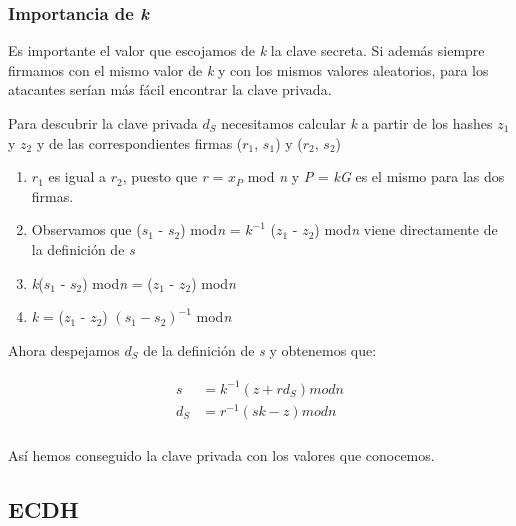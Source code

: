 \documentclass[11pt]{article}
\begin{document}
\subsubsection*{Importancia de \textit{k}}

Es importante el valor que escojamos de \textit{k} la clave secreta. Si además siempre firmamos con el mismo valor de \textit{k} y con los mismos valores aleatorios, para los atacantes serían más fácil encontrar la clave privada.

Para descubrir la clave privada \textit{$d_S$} necesitamos calcular \textit{k} a partir de los hashes \textit{$z_1$} y \textit{$z_2$} y de las correspondientes firmas (\textit{$r_1$}, \textit{$s_1$}) y (\textit{$r_2$}, \textit{$s_2$})


\begin{enumerate}
	\item $r_1$ es igual a $r_2$, puesto que \textit{r} = \textit{$x_P$} mod \textit{n} y \textit{P} = \textit{kG} es el mismo para las dos firmas.
	\item Observamos que  (\textit{$s_1$} - \textit{$s_2$}) mod\textit{n} = \textit{$k^{-1}$} (\textit{$z_1$} - \textit{$z_2$}) mod\textit{n} viene directamente de la definición de \textit{s}
	\item \textit{k}(\textit{$s_1$} - \textit{$s_2$}) mod\textit{n} = (\textit{$z_1$} - \textit{$z_2$}) mod\textit{n}
	\item \textit{k}  = (\textit{$z_1$} - \textit{$z_2$}) $(\textit{$s_1$} - \textit{$s_2$})^{-1}$ mod\textit{n}
\end{enumerate}

Ahora despejamos \textit{$d_S$} de la definición de \textit{s} y obtenemos que:


\begin{align}
\begin{split}
\textit{s} &= \textit{$k^{-1}$}(\textit{z} + \textit{r$d_S$}) mod \textit{n}\\
\textit{$d_S$} &= \textit{$r^{-1}$}(\textit{sk} - \textit{z}) mod \textit{n}\\
\end{split}
\end{align}

Así hemos conseguido la clave privada con los valores que conocemos.

\subsection{ECDH}
\end{document}
